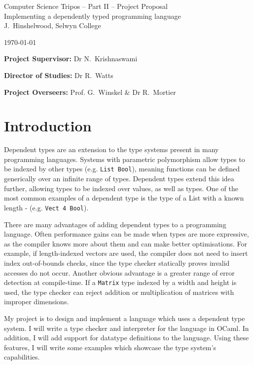 \documentclass[12pt,a4paper,twoside]{article}
\begin{document}
\begin{center}
\Large
Computer Science Tripos -- Part II -- Project Proposal\\[4mm]
\LARGE
Implementing a dependently typed programming language\\[4mm]

\large
J.~Hinshelwood, Selwyn College

\today
\end{center}

\vspace{5mm}

\textbf{Project Supervisor:} Dr N.~Krishnaswami

\textbf{Director of Studies:} Dr R.~Watts

\textbf{Project Overseers:} Prof. G.~Winskel \& Dr R.~Mortier


\section*{Introduction}

Dependent types are an extension to the type systems present in many programming languages.
Systems with parametric polymorphism allow types to be indexed by other types (e.g. \lstinline{List Bool}), meaning functions can be defined generically over an infinite range of types.
Dependent types extend this idea further, allowing types to be indexed over values, as well as types.
One of the most common examples of a dependent type is the type of a List with a known length - (e.g. \lstinline{Vect 4 Bool}).

There are many advantages of adding dependent types to a programming language.
Often performance gains can be made when types are more expressive, as the compiler knows more about them and can make better optimisations.
For example, if length-indexed vectors are used, the compiler does not need to insert index out-of-bounds checks, since the type checker statically proves invalid accesses do not occur.
Another obvious advantage is a greater range of error detection at compile-time.
If a \lstinline{Matrix} type indexed by a width and height is used, the type checker can reject addition or multiplication of matrices with improper dimensions.

My project is to design and implement a language which uses a dependent type system.
I will write a type checker and interpreter for the language in OCaml.
In addition, I will add support for datatype definitions to the language.
Using these features, I will write some examples which showcase the type system's capabilities.
\end{document}
